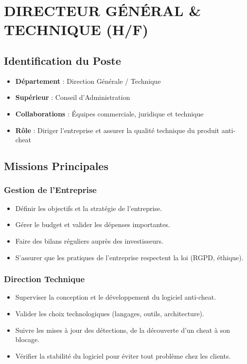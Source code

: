 \documentclass[12pt,a4paper]{article}
\begin{document}
\section{DIRECTEUR GÉNÉRAL \& TECHNIQUE (H/F)}

\subsection{Identification du Poste}
\begin{itemize}[label=\textbullet]
    \item \textbf{Département} : Direction Générale / Technique
    \item \textbf{Supérieur} : Conseil d'Administration
    \item \textbf{Collaborations} : Équipes commerciale, juridique et technique
    \item \textbf{Rôle} : Diriger l'entreprise et assurer la qualité technique du produit anti-cheat
\end{itemize}

\subsection{Missions Principales}

\subsubsection{Gestion de l'Entreprise}
\begin{itemize}[label=\textbullet]
    \item Définir les objectifs et la stratégie de l'entreprise.
    \item Gérer le budget et valider les dépenses importantes.
    \item Faire des bilans réguliers auprès des investisseurs.
    \item S'assurer que les pratiques de l'entreprise respectent la loi (RGPD, éthique).
\end{itemize}

\subsubsection{Direction Technique}
\begin{itemize}[label=\textbullet]
    \item Superviser la conception et le développement du logiciel anti-cheat.
    \item Valider les choix technologiques (langages, outils, architecture).
    \item Suivre les mises à jour des détections, de la découverte d'un cheat à son blocage.
    \item Vérifier la stabilité du logiciel pour éviter tout problème chez les clients.
\end{itemize}
\end{document}
